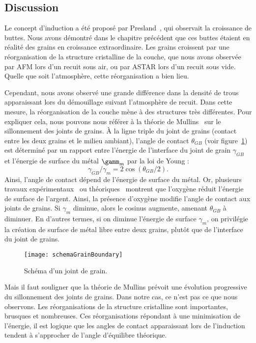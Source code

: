 {		\subsection{Discussion}
Le concept d'induction a été proposé par Presland~\cite{presland1972hillock}, qui observait la croissance de buttes. Nous avons démontré dans le chapitre précédent que ces buttes étaient en réalité des grains en croissance extraordinaire. Les grains croissent par une réorganisation de la structure cristalline de la couche, que nous avons observée par AFM lors d’un recuit sous air, ou par ASTAR lors d’un recuit sous vide. Quelle que soit l’atmosphère, cette réorganisation a bien lieu.\par 
Cependant, nous avons observé une grande différence dans la densité de trous apparaissant lors du démouillage suivant l’atmosphère de recuit. Dans cette mesure, la réorganisation de la couche mène à des structures très différentes. Pour expliquer cela, nous pouvons nous référer à la théorie de Mullins~\cite{mullins1957theory} sur le sillonnement des joints de grains. À la ligne triple du joint de grains (contact entre les deux grains et le milieu ambiant), l’angle de contact $\theta_{GB}$ (voir figure~\ref{schemaGrainBoundary}) est déterminé par un rapport entre l’énergie de l’interface du joint de grain $\gamma_{GB}$ et l’énergie de surface du métal $\gamm_m$ par la loi de Young :
\begin{equation}
\gamma_{GB}/\gamma_m = 2\cos(\theta_{GB}/2).
\end{equation}
Ainsi, l’angle de contact dépend de l’énergie de surface du métal. Or, plusieurs travaux expérimentaux~\cite{buttner1952adsorption} ou théoriques~\cite{molina2011size} montrent que l’oxygène réduit l’énergie de surface de l’argent. Ainsi, la présence d’oxygène modifie l’angle de contact aux joints de grains. Si $\gamma_m$ diminue, alors le cosinus augmente, amenant $\theta_{GB}$ à diminuer. En d’autres termes, si on diminue l’énergie de surface $\gamma_m$, on privilégie la création de surface de métal libre entre deux grains, plutôt que de l’interface du joint de grains.\par 
\begin{figure}[!htb]
\centering
\texttt{[image: schemaGrainBoundary]}
\caption{Schéma d’un joint de grain.}
\label{schemaGrainBoundary}
\end{figure}
Mais il faut souligner que la théorie de Mullins prévoit une évolution progressive du sillonnement des joints de grains. Dans notre cas, ce n’est pas ce que nous observons. Les réorganisations de la structure cristalline sont importantes, brusques et nombreuses. Ces réorganisations répondant à une minimisation de l’énergie, il est logique que les angles de contact apparaissant lors de l’induction tendent à s’approcher de l’angle d’équilibre théorique.\par 
}
